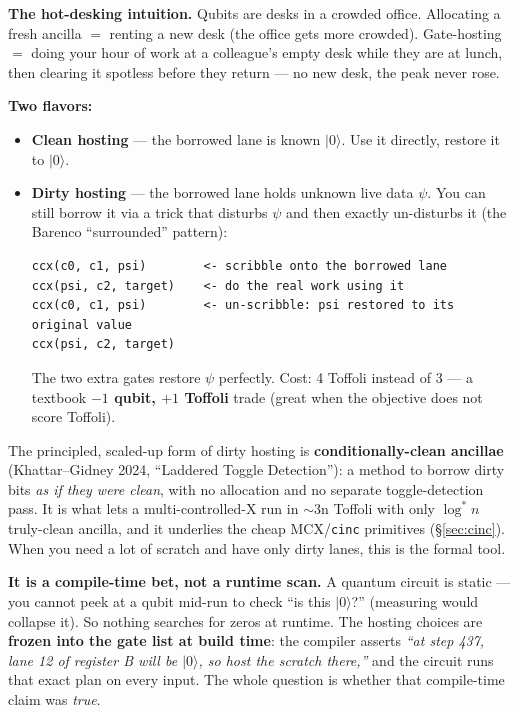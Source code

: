 \documentclass[11pt,a4paper]{article}
\begin{document}
\textbf{The hot-desking intuition.} Qubits are desks in a crowded office. Allocating a fresh ancilla
$=$ renting a new desk (the office gets more crowded). Gate-hosting $=$ doing your hour of work at a
colleague's empty desk while they are at lunch, then clearing it spotless before they return --- no
new desk, the peak never rose.

\textbf{Two flavors:}
\begin{itemize}
  \item \textbf{Clean hosting} --- the borrowed lane is known $|0\rangle$. Use it directly, restore
    it to $|0\rangle$.
  \item \textbf{Dirty hosting} --- the borrowed lane holds unknown live data $\psi$. You can still
    borrow it via a trick that disturbs $\psi$ and then exactly un-disturbs it (the Barenco
    ``surrounded'' pattern):
\begin{lstlisting}
ccx(c0, c1, psi)        <- scribble onto the borrowed lane
ccx(psi, c2, target)    <- do the real work using it
ccx(c0, c1, psi)        <- un-scribble: psi restored to its original value
ccx(psi, c2, target)
\end{lstlisting}
    The two extra gates restore $\psi$ perfectly. Cost: 4 Toffoli instead of 3 --- a textbook
    \textbf{$-1$ qubit, $+1$ Toffoli} trade (great when the objective does not score Toffoli).
\end{itemize}

The principled, scaled-up form of dirty hosting is \textbf{conditionally-clean ancillae}
(Khattar--Gidney 2024, ``Laddered Toggle Detection''): a method to borrow dirty bits \emph{as if
they were clean}, with no allocation and no separate toggle-detection pass. It is what lets a
multi-controlled-X run in $\sim$3n Toffoli with only $\log^* n$ truly-clean ancilla, and it underlies
the cheap MCX/\texttt{cinc} primitives (\S\ref{sec:cinc}). When you need a lot of scratch and have
only dirty lanes, this is the formal tool.

\textbf{It is a compile-time bet, not a runtime scan.} A quantum circuit is static --- you cannot
peek at a qubit mid-run to check ``is this $|0\rangle$?'' (measuring would collapse it). So nothing
searches for zeros at runtime. The hosting choices are \textbf{frozen into the gate list at build
time}: the compiler asserts \emph{``at step 437, lane 12 of register B will be $|0\rangle$, so host
the scratch there,''} and the circuit runs that exact plan on every input. The whole question is
whether that compile-time claim was \emph{true}.
\end{document}

